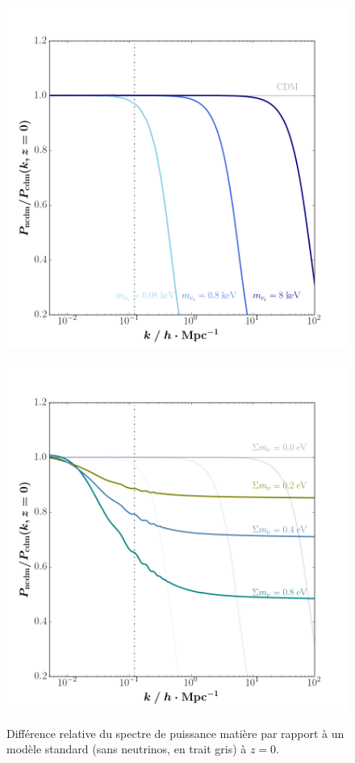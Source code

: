 \begin{figure}
\begin{center}
\includegraphics[width=0.55\columnwidth]{Figures/Pk_wdm.png}~%
\includegraphics[width=0.55\columnwidth]{Figures/Pk_chdm.png}
\caption{Différence relative du spectre de puissance matière par rapport à un modèle standard (sans neutrinos, en trait gris) à $z=0$.}
\label{fig:pm}
\end{center}
\end{figure}


